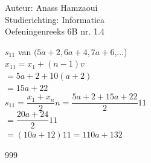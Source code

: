 \documentclass[a4paper]{article}
\begin{document}
  
\noindent \large Auteur: Anass Hamzaoui \\
\noindent \large Studierichting: Informatica\\
\noindent \large Oefeningenreeks 6B nr. 1.4\\

\medskip

\normalsize

$s_{11}$ van $(5a+2,6a+4,7a+6$,...)\\

$x_{11} = x_1 + (n-1)v$\\

$= 5a+2 + 10(a+2)$\\

$= 15a + 22$\\

$s_{11} = \dfrac{x_1+x_n}{2}n = \dfrac{5a+2 + 15a+22}{2}11$\\

$= \dfrac{20a+24}{2}11$\\

$= (10a + 12)11 = 110a + 132$\\

\begin{thebibliography}{999}
\end{thebibliography}
\end{document}
